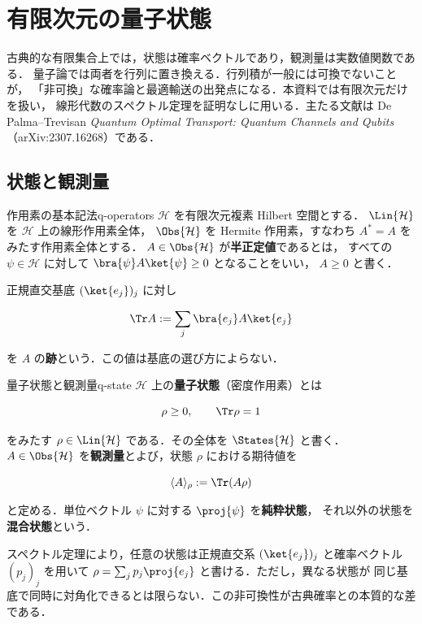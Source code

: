 \chapter{有限次元の量子状態}
\label{ch:quantum-states}

古典的な有限集合上では，状態は確率ベクトルであり，観測量は実数値関数である．
量子論では両者を行列に置き換える．行列積が一般には可換でないことが，
「非可換」な確率論と最適輸送の出発点になる．本資料では有限次元だけを扱い，
線形代数のスペクトル定理を証明なしに用いる．主たる文献は De Palma--Trevisan
\emph{Quantum Optimal Transport: Quantum Channels and Qubits}
（arXiv:2307.16268）である．

\section{状態と観測量}

\begin{definition}{作用素の基本記法}{q-operators}
  $\mathcal{H}$ を有限次元複素 Hilbert 空間とする．
  $\Lin{\mathcal{H}}$ を $\mathcal{H}$ 上の線形作用素全体，
  $\Obs{\mathcal{H}}$ を Hermite 作用素，すなわち $A^*=A$ をみたす作用素全体とする．
  $A\in\Obs{\mathcal{H}}$ が\textbf{半正定値}であるとは，
  すべての $\psi\in\mathcal{H}$ に対して $\bra{\psi}A\ket{\psi}\geq0$ となることをいい，
  $A\geq0$ と書く．

  正規直交基底 $(\ket{e_j})_j$ に対し

  \[
    \Tr A:=\sum_j\bra{e_j}A\ket{e_j}
  \]

  を $A$ の\textbf{跡}という．この値は基底の選び方によらない．
\end{definition}

\begin{definition}{量子状態と観測量}{q-state}
  $\mathcal{H}$ 上の\textbf{量子状態}（密度作用素）とは

  \[
    \rho\geq0,
    \qquad
    \Tr\rho=1
  \]

  をみたす $\rho\in\Lin{\mathcal{H}}$ である．その全体を $\States{\mathcal{H}}$ と書く．
  $A\in\Obs{\mathcal{H}}$ を\textbf{観測量}とよび，状態 $\rho$ における期待値を

  \[
    \langle A\rangle_\rho:=\Tr(A\rho)
  \]

  と定める．単位ベクトル $\psi$ に対する $\proj{\psi}$ を\textbf{純粋状態}，
  それ以外の状態を\textbf{混合状態}という．
\end{definition}

スペクトル定理により，任意の状態は正規直交系 $(\ket{e_j})_j$ と確率ベクトル
$(p_j)_j$ を用いて $\rho=\sum_jp_j\proj{e_j}$ と書ける．ただし，異なる状態が
同じ基底で同時に対角化できるとは限らない．この非可換性が古典確率との本質的な差である．

